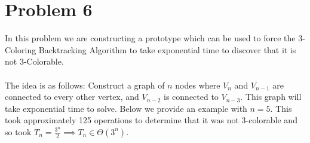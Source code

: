 \section*{Problem 6}

In this problem we are constructing a prototype which can be used to force the 3-Coloring Backtracking Algorithm to take exponential time to discover that it is not 3-Colorable.
\\
\\
The idea is as follows: Construct a graph of $n$ nodes where $V_n$ and $V_{n-1}$ are connected to every other vertex, and $V_{n-2}$ is connected to $V_{n-3}$. This graph will take exponential time to solve. Below we provide an example with $n = 5$. This took approximately 125 operations to determine that it was not 3-colorable and so took $T_n = \frac{3^n}{2} \implies T_n \in \Theta \left(3^n\right)$.

\begin{center}
\end{center}